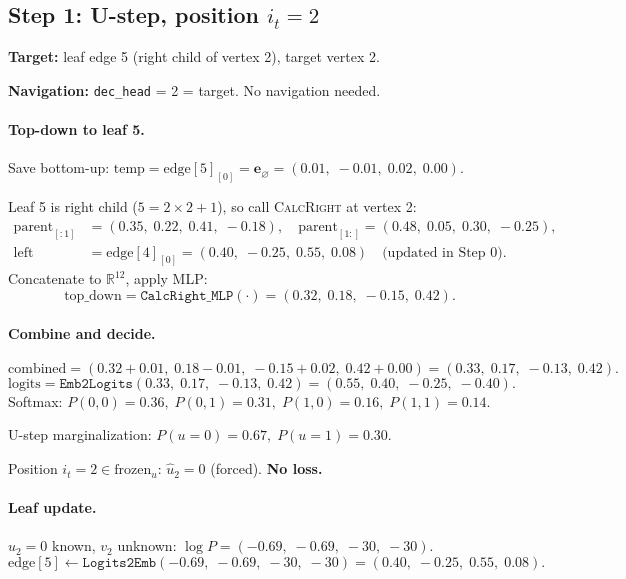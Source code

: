 \documentclass[11pt,a4paper]{article}
\newcommand{\R}{\mathbb{R}}
\newcommand{\noinf}{\mathbf{e}_{\varnothing}}
\newcommand{\calR}{\textsc{CalcRight}}
\begin{document}
\subsection{Step 1: U-step, position $i_t = 2$}

\textbf{Target:} leaf edge 5 (right child of vertex 2), target vertex 2.

\textbf{Navigation:} \texttt{dec\_head} = 2 = target.  No navigation needed.

\paragraph{Top-down to leaf 5.}
Save bottom-up: $\text{temp} = \text{edge}[5]_{[0]} = \noinf = (0.01,\; -0.01,\; 0.02,\; 0.00)$.

Leaf 5 is right child ($5 = 2 \times 2 + 1$), so call \calR{} at vertex 2:
\begin{align*}
\text{parent}_{[:1]} &= (0.35,\; 0.22,\; 0.41,\; -0.18), \quad
\text{parent}_{[1:]} = (0.48,\; 0.05,\; 0.30,\; -0.25), \\
\text{left} &= \text{edge}[4]_{[0]} = (0.40,\; -0.25,\; 0.55,\; 0.08) \quad \text{(updated in Step 0)}.
\end{align*}
Concatenate to $\R^{12}$, apply MLP:
\[
\text{top\_down} = \texttt{CalcRight\_MLP}(\cdot) = (0.32,\; 0.18,\; -0.15,\; 0.42).
\]

\paragraph{Combine and decide.}
\[
\text{combined} = (0.32 + 0.01,\; 0.18 - 0.01,\; -0.15 + 0.02,\; 0.42 + 0.00) = (0.33,\; 0.17,\; -0.13,\; 0.42).
\]
\[
\text{logits} = \texttt{Emb2Logits}(0.33,\; 0.17,\; -0.13,\; 0.42) = (0.55,\; 0.40,\; -0.25,\; -0.40).
\]
Softmax: $P(0,0) = 0.36,\; P(0,1) = 0.31,\; P(1,0) = 0.16,\; P(1,1) = 0.14$.

U-step marginalization: $P(u{=}0) = 0.67,\; P(u{=}1) = 0.30$.

Position $i_t = 2 \in \text{frozen}_u$: $\hat{u}_2 = 0$ (forced).  \textbf{No loss.}

\paragraph{Leaf update.}
$u_2 = 0$ known, $v_2$ unknown: $\log P = (-0.69,\; -0.69,\; -30,\; -30)$.
\[
\text{edge}[5] \leftarrow \texttt{Logits2Emb}(-0.69,\; -0.69,\; -30,\; -30) = (0.40,\; -0.25,\; 0.55,\; 0.08).
\]
\end{document}
